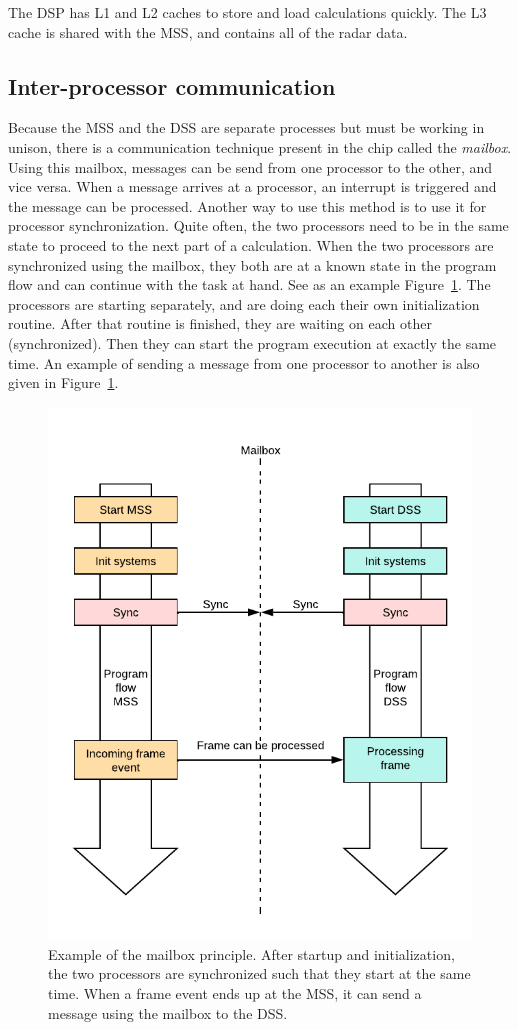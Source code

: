 The DSP has L1 and L2 caches to store and load calculations quickly. The L3 cache is shared with the MSS, and contains all of the radar data. 

\subsection{Inter-processor communication}
Because the MSS and the DSS are separate processes but must be working in unison, there is a communication technique present in the chip called the \emph{mailbox}. Using this mailbox, messages can be send from one processor to the other, and vice versa. When a message arrives at a processor, an interrupt is triggered and the message can be processed. Another way to use this method is to use it for processor synchronization. Quite often, the two processors need to be in the same state to proceed to the next part of a calculation. When the two processors are synchronized using the mailbox, they both are at a known state in the program flow and can continue with the task at hand. See as an example Figure~\ref{fig:mailbox_principle}. The processors are starting separately, and are doing each their own initialization routine. After that routine is finished, they are waiting on each other (synchronized). Then they can start the program execution at exactly the same time. An example of sending a message from one processor to another is also given in Figure~\ref{fig:mailbox_principle}.

\begin{figure}[t]
\centering
\includegraphics[width=.6\textwidth]{figures/realtime_implementation/Mailbox working principle.pdf}
\caption{Example of the mailbox principle. After startup and initialization, the two processors are synchronized such that they start at the same time. When a frame event ends up at the MSS, it can send a message using the mailbox to the DSS.}
\label{fig:mailbox_principle}
\end{figure}

